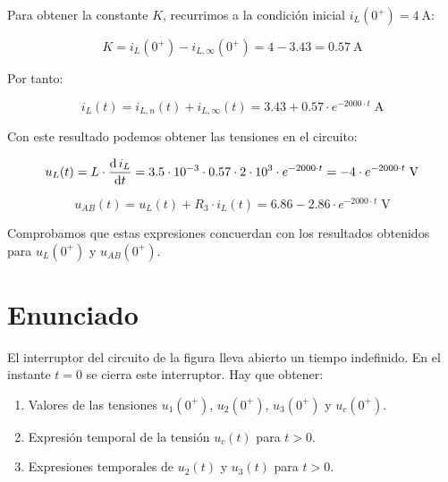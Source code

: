 \vspace{2mm}
Para obtener la constante $K$, recurrimos a la condición inicial
$i_L(0^+) = \qty{4}{\ampere}$:

\begin{equation*}
  K = i_L(0^+) - i_{L,\infty}(0^+) = 4 - 3.43 = \qty{0.57}{\ampere}
\end{equation*}

Por tanto:

\begin{equation*}
  i_L(t) = i_{L,n}(t) + i_{L,\infty}(t) = 3.43 + 0.57 \cdot e^{-2000 \cdot t} \;\unit{\ampere}
\end{equation*}

\vspace{2mm}
Con este resultado podemos obtener las tensiones en el circuito:

\begin{equation*}
  u_L(t) = L \cdot \diff{\, i_L}{t} = 3.5\cdot 10^{-3} \cdot 0.57 \cdot 2\cdot 10^{3} \cdot e^{-2000 \cdot t} = - 4 \cdot e^{-2000 \cdot t} \;\unit{\volt}
\end{equation*}

\begin{equation*}
  u_{AB}(t) =  u_L(t) + R_3 \cdot i_L(t) = 6.86 - 2.86 \cdot e^{-2000 \cdot t} \;\unit{\volt}
\end{equation*}

\vspace{2mm}
Comprobamos que estas expresiones concuerdan con los resultados
obtenidos para $u_L(0^+)$ y $u_{AB}(0^+)$.

\section{Enunciado}

El interruptor del circuito de la figura lleva abierto un tiempo
indefinido. En el instante $t= 0$ se cierra este interruptor. Hay que
obtener:
\begin{enumerate}
\item Valores de las tensiones $u_1(0^+)$, $u_2(0^+)$, $u_3(0^+)$ y
  $u_c(0^+)$.
\item Expresión temporal de la tensión $u_c(t)$ para $t > 0$.
\item Expresiones temporales de $u_2(t)$ y $u_3(t)$ para $t > 0$.
\end{enumerate}

